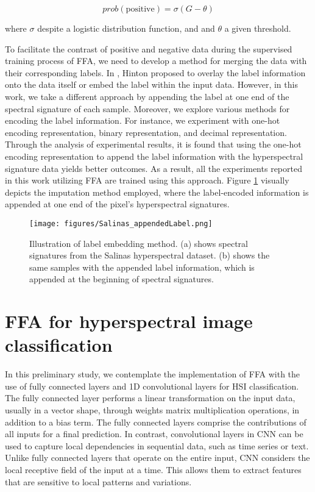 \documentclass{article}
\begin{document}
\begin{equation}
    prob(\text{positive})=\sigma(G-\theta)
\end{equation}

\noindent where $\sigma$ despite a logistic distribution function, and and $\theta$ a given threshold. 


To facilitate the contrast of positive and negative data during the supervised training process of FFA, we need to develop a method for merging the data with their corresponding labels. In \cite{hinton2022forward}, Hinton proposed to overlay the label information onto the data itself or embed the label within the input data. However, in this work, we take a different approach by appending the label at one end of the spectral signature of each sample. Moreover, we explore various methods for encoding the label information. For instance, we experiment with one-hot encoding representation, binary representation, and decimal representation. Through the analysis of experimental results, it is found that using the one-hot encoding representation to append the label information with the hyperspectral signature data yields better outcomes. As a result, all the experiments reported in this work utilizing FFA are trained using this approach.
Figure \ref{fig1} visually depicts the imputation method employed, where the label-encoded information is appended at one end of the pixel's hyperspectral signatures.



\begin{figure}[ht]%
\centering
\texttt{[image: figures/Salinas\_appendedLabel.png]}
\caption{Illustration of label embedding method. (a) shows spectral signatures from the Salinas hyperspectral dataset. (b) shows the same samples with the appended label information, which is appended at the beginning of spectral signatures.}\label{fig1}
\end{figure}






\section{FFA for hyperspectral image classification}\label{sec: ffnForHSI}
In this preliminary study, we contemplate the implementation of FFA with the use of fully connected layers and 1D convolutional layers for HSI classification.
The fully connected layer performs a linear transformation on the input data, usually in a vector shape, through weights matrix multiplication operations, in addition to a bias term. The fully connected layers comprise the contributions of all inputs for a final prediction. 
In contrast, convolutional layers in CNN can be used to capture local dependencies in sequential data, such as time series or text. Unlike fully connected layers that operate on the entire input, CNN considers the local receptive field of the input at a time. This allows them to extract features that are sensitive to local patterns and variations.
\end{document}
